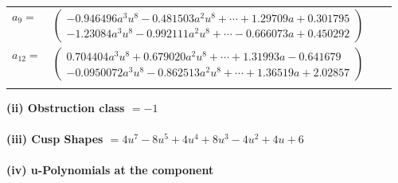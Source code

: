 \documentclass[1p]{elsarticle_modified}
\theoremstyle{definition}
\begin{document}
\begin{tabular}{m{7pt} m{180pt} m{7pt} m{180pt} }
\flushright $a_{9}=$&$\begin{pmatrix}-0.946496 a^{3} u^{8}-0.481503 a^{2} u^{8}+\cdots+1.29709 a+0.301795\\-1.23084 a^{3} u^{8}-0.992111 a^{2} u^{8}+\cdots-0.666073 a+0.450292\end{pmatrix}$ \\
\flushright $a_{12}=$&$\begin{pmatrix}0.704404 a^{3} u^{8}+0.679020 a^{2} u^{8}+\cdots+1.31993 a-0.641679\\-0.0950072 a^{3} u^{8}-0.862513 a^{2} u^{8}+\cdots+1.36519 a+2.02857\end{pmatrix}$\\&\end{tabular}
\flushleft \textbf{(ii) Obstruction class $= -1$}\\~\\
\flushleft \textbf{(iii) Cusp Shapes $= 4 u^7-8 u^5+4 u^4+8 u^3-4 u^2+4 u+6$}\\~\\
\newpage\renewcommand{\arraystretch}{1}
\flushleft \textbf{(iv) u-Polynomials at the component}\newline \\
\end{document}
